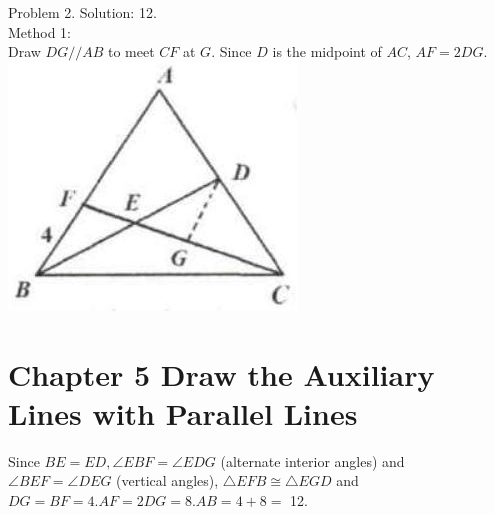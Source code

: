 \documentclass[10pt]{article}
\begin{document}
Problem 2. Solution: 12.\\
Method 1:\\
Draw \(D G / / A B\) to meet \(C F\) at \(G\). Since \(D\) is the midpoint of \(A C\), \(A F=2 D G\).\\
\includegraphics[max width=\textwidth, center]{2025_04_17_97bc1f7e44d93c271a88g-131(1)}

\section*{Chapter 5 Draw the Auxiliary Lines with Parallel Lines}
Since \(B E=E D, \angle E B F=\angle E D G\) (alternate interior angles) and \(\angle B E F=\angle D E G\) (vertical angles), \(\triangle E F B \cong \triangle E G D\) and \(D G=B F=4 . A F=2 D G=8 . A B=4+8=\) 12.
\end{document}
